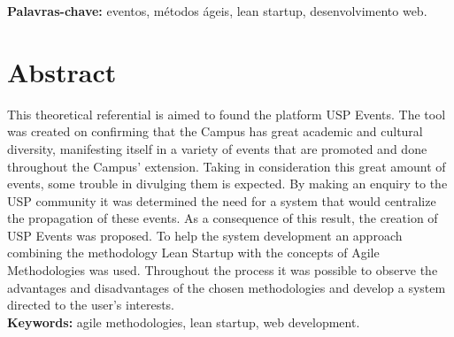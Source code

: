 \documentclass[12pt,twoside,a4paper]{book}
\begin{document}
\noindent \textbf{Palavras-chave:} eventos, métodos ágeis, lean startup, desenvolvimento web.

\chapter*{Abstract}

\par This theoretical referential is aimed to found the platform USP Events. The tool was created on confirming that the Campus has great academic and cultural diversity, manifesting itself in a variety of events that are promoted and done throughout the Campus’ extension. Taking in consideration this great amount of events, some trouble in divulging them is expected. By making an enquiry to the USP community it was determined the need for a system that would centralize the propagation of these events. As a consequence of this result, the creation of USP Events was proposed. To help the system development an approach combining the methodology Lean Startup with the concepts of Agile Methodologies was used. Throughout the process it was possible to observe the advantages and disadvantages of the chosen methodologies and develop a system directed to the user’s interests.
\\

\noindent \textbf{Keywords:} agile methodologies, lean startup, web development.

\tableofcontents    %


\end{document}
